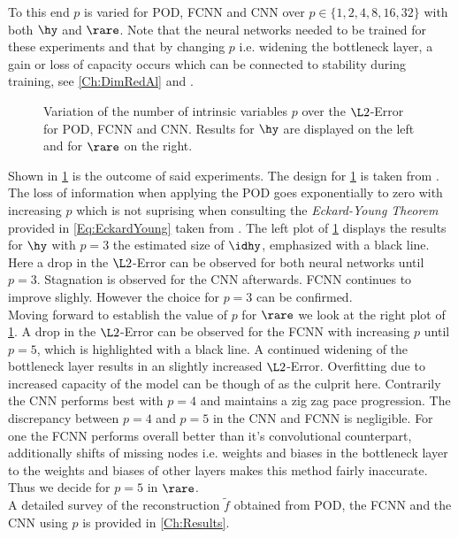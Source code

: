 To this end $p$ is varied for POD, FCNN and CNN over $p \in \{1,2,4,8,16,32\}$ with both $\hy$ and $\rare$. Note that the neural networks needed to be trained for these experiments and that by changing $p$ i.e. widening the bottleneck layer, a gain or loss of capacity occurs which can be connected to stability during training, see \cref{Ch:DimRedAl} and \cite{Goodfellow}.
\begin{figure}[htbp!]
	
	\caption{Variation of the number of intrinsic variables \(p\) over the $\L2$-Error for POD, FCNN and CNN. Results for $\hy$ are displayed on the left and for $\rare$ on the right.}
	\label{Fig:IntVar}
\end{figure}
Shown in \cref{Fig:IntVar} is the outcome of said experiments. The design for \cref{Fig:IntVar} is taken from \cite{Carlberg}. The loss of information when applying the POD goes exponentially to zero with increasing $p$ which is not suprising when consulting the \textit{Eckard-Young Theorem} provided in \cref{Eq:EckardYoung} taken from \cite{Kutz}.
The left plot of \cref{Fig:IntVar} displays the results for $\hy$ with $p=3$ the estimated size of \(\idhy\), emphasized with a black line. Here a drop in the $\L2$-Error can be observed for both neural networks until $p = 3$. Stagnation is observed for the CNN afterwards. FCNN continues to improve slighly. However the choice for $p=3$ can be confirmed.\\
Moving forward to establish the value of \(p\) for $\rare$ we look at the right plot of \cref{Fig:IntVar}. A drop in the $\L2$-Error can be observed for the FCNN with increasing $p$ until $p = 5$, which is highlighted with a black line. A continued widening of the bottleneck layer results in an slightly increased $\L2$-Error. Overfitting due to increased capacity of the model can be though of as the culprit here. Contrarily the CNN performs best with \(p = 4\) and maintains a zig zag pace progression. The discrepancy between \(p=4\) and \(p = 5\) in the CNN and FCNN is negligible. For one the FCNN performs overall better than it's convolutional counterpart, additionally shifts of missing nodes i.e. weights and biases in the bottleneck layer to the weights and biases of other layers makes this \glqq method\grqq{} fairly inaccurate. Thus we decide for \(p=5\) in \(\rare\).\\
A detailed survey of the reconstruction \(\tilde{f}\) obtained from POD, the FCNN and the CNN  using \(p\) is provided in \cref{Ch:Results}. 
